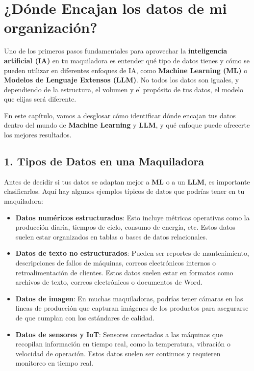 \documentclass[
  10pt,
  letterpaper,
]{book}
\begin{document}
\section{¿Dónde Encajan los datos de mi
organización?}\label{duxf3nde-encajan-los-datos-de-mi-organizaciuxf3n}

Uno de los primeros pasos fundamentales para aprovechar la
\textbf{inteligencia artificial (IA)} en tu maquiladora es entender qué
tipo de datos tienes y cómo se pueden utilizar en diferentes enfoques de
IA, como \textbf{Machine Learning (ML)} o \textbf{Modelos de Lenguaje
Extensos (LLM)}. No todos los datos son iguales, y dependiendo de la
estructura, el volumen y el propósito de tus datos, el modelo que elijas
será diferente.

En este capítulo, vamos a desglosar cómo identificar dónde encajan tus
datos dentro del mundo de \textbf{Machine Learning} y \textbf{LLM}, y
qué enfoque puede ofrecerte los mejores resultados.

\subsection{\texorpdfstring{1. \textbf{Tipos de Datos en una
Maquiladora}}{1. Tipos de Datos en una Maquiladora}}\label{tipos-de-datos-en-una-maquiladora}

Antes de decidir si tus datos se adaptan mejor a \textbf{ML} o a un
\textbf{LLM}, es importante clasificarlos. Aquí hay algunos ejemplos
típicos de datos que podrías tener en tu maquiladora:

\begin{itemize}
\item
  \textbf{Datos numéricos estructurados}: Esto incluye métricas
  operativas como la producción diaria, tiempos de ciclo, consumo de
  energía, etc. Estos datos suelen estar organizados en tablas o bases
  de datos relacionales.
\item
  \textbf{Datos de texto no estructurados}: Pueden ser reportes de
  mantenimiento, descripciones de fallos de máquinas, correos
  electrónicos internos o retroalimentación de clientes. Estos datos
  suelen estar en formatos como archivos de texto, correos electrónicos
  o documentos de Word.
\item
  \textbf{Datos de imagen}: En muchas maquiladoras, podrías tener
  cámaras en las líneas de producción que capturan imágenes de los
  productos para asegurarse de que cumplan con los estándares de
  calidad.
\item
  \textbf{Datos de sensores y IoT}: Sensores conectados a las máquinas
  que recopilan información en tiempo real, como la temperatura,
  vibración o velocidad de operación. Estos datos suelen ser continuos y
  requieren monitoreo en tiempo real.
\end{itemize}
\end{document}
